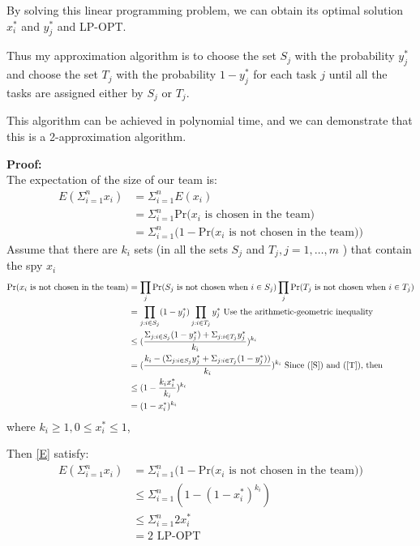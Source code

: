 \documentclass[a4paper,12pt]{article}
\begin{document}
By solving this linear programming problem, we can obtain its optimal solution $x_i^*$ and $y_j^*$ and LP-OPT. 

Thus my approximation algorithm is to choose the set $S_j$ with the probability $y_j^*$ and choose the set $T_j$ with the probability $1-y_j^*$ for each task $j$ until all the tasks are assigned either by $S_j$ or $T_j$. 

This algorithm can be achieved in polynomial time, and we can demonstrate that this is a 2-approximation algorithm.

\noindent \textbf{Proof:\\}
The expectation  of the size of our team is:
\begin{align} 
E(\Sigma_{ i= 1}^n   x_{i}) & = \Sigma_{ i= 1}^n   E(x_{i})\\ 
& = \Sigma_{ i= 1}^n  \text{Pr($x_i$ is chosen in the team)}\\ 
& = \Sigma_{ i= 1}^n  (1-\text{Pr($x_i$ is not chosen in the team))} \label{E}
\end{align} 
Assume that there are $k_i$ sets (in all the sets $S_j$ and $T_j, j=1, \dots , m $ ) that contain the spy $x_i$
\begin{align}
\text{Pr($x_i$ is not chosen in the team)} & = \prod_{j}\text{Pr($S_j$ is not chosen when $i \in S_j$)} \prod_j \text{Pr($T_j$ is not chosen when $i \in T_j$)}\\
&= \prod_{j: i \in S_j} (1-y_j^*) \prod_{j: i \in T_j} y_j^*\text{ Use the arithmetic-geometric inequality} \\ 
& \leq (\frac{\Sigma_{j: i \in S_j} (1-y_j^*)  + \Sigma_{j: i \in T_j}  y_j^* }{k_i})^{k_i} \\
&=(\frac{k_i-(\Sigma_{j: i \in S_j}   y_j^*  + \Sigma_{j: i \in T_j} (1-y_j^*))}{k_i})^{k_i} \text{ Since (\ref{S}) and (\ref{T}), then }\\
& \leq(1-\frac{k_i x_i^*}{k_i})^{k_i}  \\ 
& = (1-x_i^*)^{k_i} 
\end{align}
where $k_i \geq 1, 0 \leq x_i^* \leq 1$,

Then \eqref{E} satisfy:\\
\begin{align}
E(\Sigma_{ i= 1}^n   x_{i}) & =  \Sigma_{ i= 1}^n  (1-\text{Pr($x_i$ is not chosen in the team))}\\
& \leq  \Sigma_{ i= 1}^n  (1- (1-x_i^*)^{k_i} ) \\ \label{show}
& \leq \Sigma_{ i= 1}^n 2 x_i^*  \\ 
& =2 \text{ LP-OPT}
\end{align} 
\end{document}
